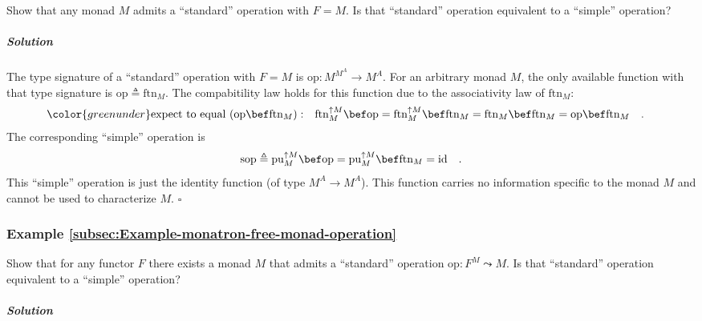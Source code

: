 Show that any monad $M$ admits a \textsf{``}standard\textsf{''} operation with $F=M$.
Is that \textsf{``}standard\textsf{''} operation equivalent to a \textsf{``}simple\textsf{''} operation?

\subparagraph{Solution}

The type signature of a \textsf{``}standard\textsf{''} operation with $F=M$ is $\text{op}:M^{M^{A}}\rightarrow M^{A}$.
For an arbitrary monad $M$, the only available function with that
type signature is $\text{op}\triangleq\text{ftn}_{M}$. The compabitility
law holds for this function due to the associativity law of $\text{ftn}_{M}$:
\begin{align*}
{\color{greenunder}\text{expect to equal }(\text{op}\bef\text{ftn}_{M}):}\quad & \text{ftn}_{M}^{\uparrow M}\bef\text{op}=\text{ftn}_{M}^{\uparrow M}\bef\text{ftn}_{M}=\text{ftn}_{M}\bef\text{ftn}_{M}=\text{op}\bef\text{ftn}_{M}\quad.
\end{align*}
The corresponding \textsf{``}simple\textsf{''} operation is 
\[
\text{sop}\triangleq\text{pu}_{M}^{\uparrow M}\bef\text{op}=\text{pu}_{M}^{\uparrow M}\bef\text{ftn}_{M}=\text{id}\quad.
\]
This \textsf{``}simple\textsf{''} operation is just the identity function (of type
$M^{A}\rightarrow M^{A}$). This function carries no information specific
to the monad $M$ and cannot be used to characterize $M$. $\square$

\subsubsection{Example \label{subsec:Example-monatron-free-monad-operation}\ref{subsec:Example-monatron-free-monad-operation}}

Show that for any functor $F$ there exists a monad $M$ that admits
a \textsf{``}standard\textsf{''} operation $\text{op}:F^{M}\leadsto M$. Is that \textsf{``}standard\textsf{''}
operation equivalent to a \textsf{``}simple\textsf{''} operation?

\subparagraph{Solution}

